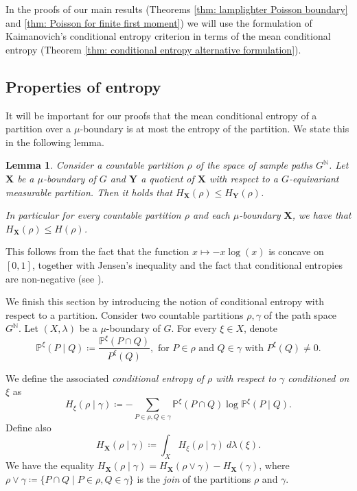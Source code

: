 \documentclass[reqno,oneside,11pt]{amsart}
\renewcommand{\P}{\mathbb{P}}
\theoremstyle{plain}
\newtheorem{lem}[thm]{Lemma}
\theoremstyle{definition}
\begin{document}
In the proofs of our main results (Theorems \ref{thm: lamplighter Poisson boundary} and \ref{thm: Poisson for finite first moment}) we will use the formulation of Kaimanovich's conditional entropy criterion in terms of the mean conditional entropy (Theorem \ref{thm: conditional entropy alternative formulation}). 

\subsection{Properties of entropy}
It will be important for our proofs that the mean conditional entropy of a partition over a $\mu$-boundary is at most the entropy of the partition. We state this in the following lemma.
\begin{lem}\label{lem: conditional entropy is at most the usual entropy}
	Consider a countable partition $\rho$ of the space of sample paths $G^{\mathbb{N}}$. Let $\mathbf{X}$ be a $\mu$-boundary of $G$ and $\mathbf{Y}$ a quotient of $\mathbf{X}$ with respect to a $G$-equivariant measurable partition. Then it holds that $H_{\mathbf{X}}(\rho) \leq H_{\mathbf{Y}}(\rho)$.
	
	In particular for every countable partition $\rho$ and each $\mu$-boundary $\mathbf{X}$, we have that $H_{\mathbf{X}}(\rho) \leq H(\rho)$.
\end{lem}
This follows from the fact that the function $x\mapsto -x\log(x)$ is concave on $[0,1]$, together with Jensen's inequality and the fact that conditional entropies are non-negative (see \cite[Section 5.10]{Rohlin1967}). 

We finish this section by introducing the notion of conditional entropy with respect to a partition. Consider two countable partitions $\rho,\gamma$ of the path space $G^{\mathbb{N}}$. Let $(X,\lambda)$ be a $\mu$-boundary of $G$. For every $\xi \in X$, denote 
\begin{equation*}
	\P^{\xi}(P\mid Q)\coloneqq \frac{\P^{\xi}(P\cap Q)}{P^{\xi}(Q)}, \text{ for }P\in \rho\text{ and }Q\in \gamma \text{ with }P^{\xi}(Q)\neq 0.
\end{equation*}

We define the associated \emph{conditional entropy of $\rho$ with respect to $\gamma$ conditioned on $\xi$} as
\begin{equation*}
	H_{\xi}(\rho\mid \gamma)\coloneqq -\sum_{P\in \rho, Q\in \gamma}\P^{\xi}(P\cap Q)\log \P^{\xi}(P\mid Q).
\end{equation*}
Define also 
\begin{equation}\label{eq: mean conditional entropy on boundary and partition}
	H_{\mathbf{X}}(\rho\mid \gamma)\coloneqq \int_{X}H_{\xi}(\rho\mid \gamma)\ d\lambda (\xi).
\end{equation}
We have the equality $H_{\mathbf{X}}(\rho\mid \gamma)=H_{\mathbf{X}}(\rho\vee \gamma)-H_{\mathbf{X}}(\gamma)$, where $\rho \vee \gamma \coloneqq \{P\cap Q\mid P\in \rho, Q\in \gamma \}$ is the \emph{join} of the partitions $\rho$ and $\gamma$.
\end{document}
